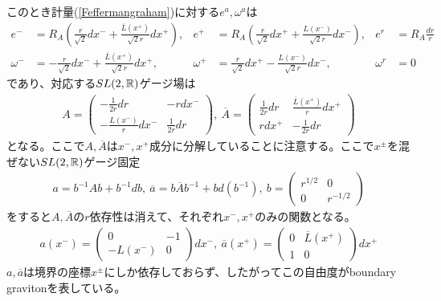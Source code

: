 このとき計量(\ref{Feffermangraham})に対する$e^a,\omega^a$は
\begin{align}
e^-&=R_A\left(\frac{r}{\sqrt{2}}dx^-+\frac{\overline{L}(x^+)}{\sqrt{2}r}dx^+\right),&
e^+&=R_A\left(\frac{r}{\sqrt{2}}dx^++\frac{L(x^-)}{\sqrt{2}r}dx^-\right),&
e^r&=R_A\frac{dr}{r}\\
\omega^-&=-\frac{r}{\sqrt{2}}dx^-+\frac{\overline{L}(x^+)}{\sqrt{2}r}dx^+,&
\omega^+&=\frac{r}{\sqrt{2}}dx^+-\frac{L(x^-)}{\sqrt{2}r}dx^-,&
\omega^r&=0
\end{align}
であり、対応する$SL(2,\mathbb{R})$ゲージ場は
\begin{align}
A=\left(\begin{array}{cc}
-\frac{1}{2r}dr & -rdx^- \\
-\frac{L(x^-)}{r}dx^- & \frac{1}{2r}dr \end{array}
\right),\ 
\overline{A}=\left(\begin{array}{cc}
\frac{1}{2r}dr & \frac{\overline{L}(x^+)}{r}dx^+ \\
rdx^+ & -\frac{1}{2r}dr \end{array}
\right)
\end{align}
となる。ここで$A,\overline{A}$は$x^-,x^+$成分に分解していることに注意する。ここで$x^\pm$を混ぜない$SL(2,\mathbb{R})$ゲージ固定
\begin{align}
a=b^{-1}Ab+b^{-1}db,\ \overline{a}=b\overline{A}b^{-1}+bd(b^{-1}),\ b=\left(\begin{array}{cc}
r^{1/2} & 0\\
0 & r^{-1/2} \end{array}
\right)
\end{align}
をすると$A,\overline{A}$の$r$依存性は消えて、それぞれ$x^-,x^+$のみの関数となる。
\begin{align}
a(x^-)=\left(\begin{array}{cc}
0 & -1 \\
-L(x^-) & 0 \end{array}
\right)dx^-,\ 
\overline{a}(x^+)=\left(\begin{array}{cc}
0 & \overline{L}(x^+) \\
1 & 0 \end{array}
\right)dx^+
\end{align}
$a,\overline{a}$は境界の座標$x^\pm$にしか依存しておらず、したがってこの自由度がboundary gravitonを表している。

